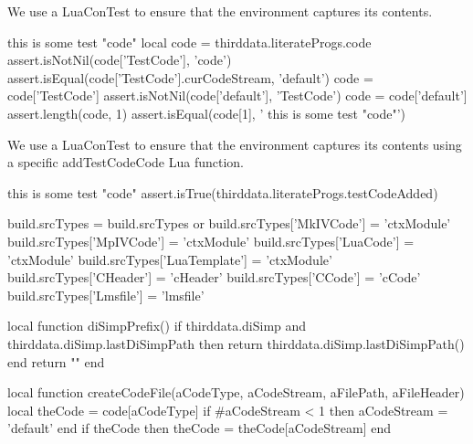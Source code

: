 \def\addMITLicense#1#2#3{
  \directlua{
    thirddata.literateProgs.addMITLicense('#1', '#2', '#3')
  }
}

\def\addApacheLicense#1#2#3{
  \directlua{
    thirddata.literateProgs.addApacheLicense('#1', '#2', '#3')
  }
}
\stopMkIVCode


We use a LuaConTest to ensure that the  environment
captures its contents.

\startConTest
\begingroup
  \startTestCode
    this is some test "code"
  \stopTestCode
  \startLuaConTest
    local code = thirddata.literateProgs.code
    assert.isNotNil(code['TestCode'], 'code')
    assert.isEqual(code['TestCode'].curCodeStream, 'default')
    code = code['TestCode']
    assert.isNotNil(code['default'], 'TestCode')
    code = code['default']
    assert.length(code, 1)
    assert.isEqual(code[1], '    this is some test "code"')
  \stopLuaConTest
\endgroup
\stopConTest
\stopTestCase


We use a LuaConTest to ensure that the  environment
captures its contents using a specific addTestCodeCode Lua function.

\startConTest
\begingroup
  \startTestCode
    this is some test "code"
  \stopTestCode
  \startLuaConTest
    assert.isTrue(thirddata.literateProgs.testCodeAdded)
  \stopLuaConTest
\endgroup
\stopConTest
\stopTestCase

\startLuaCode

build.srcTypes = build.srcTypes or { }
build.srcTypes['MkIVCode']    = 'ctxModule'
build.srcTypes['MpIVCode']    = 'ctxModule'
build.srcTypes['LuaCode']     = 'ctxModule'
build.srcTypes['LuaTemplate'] = 'ctxModule'
build.srcTypes['CHeader']     = 'cHeader'
build.srcTypes['CCode']       = 'cCode'
build.srcTypes['Lmsfile']     = 'lmsfile'

local function diSimpPrefix()
  if thirddata.diSimp and thirddata.diSimp.lastDiSimpPath then
    return thirddata.diSimp.lastDiSimpPath()
  end
  return ""
end

local function createCodeFile(aCodeType,
                              aCodeStream,
                              aFilePath,
                              aFileHeader)
  local theCode = code[aCodeType]
  if #aCodeStream < 1 then aCodeStream = 'default' end
  if theCode then theCode = theCode[aCodeStream] end


